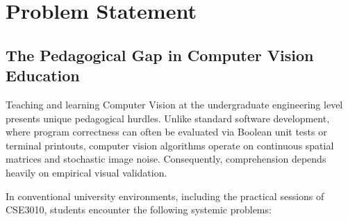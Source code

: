 \section{Problem Statement}

\subsection{The Pedagogical Gap in Computer Vision Education}
Teaching and learning Computer Vision at the undergraduate engineering level presents unique pedagogical hurdles. Unlike standard software development, where program correctness can often be evaluated via Boolean unit tests or terminal printouts, computer vision algorithms operate on continuous spatial matrices and stochastic image noise. Consequently, comprehension depends heavily on empirical visual validation.

In conventional university environments, including the practical sessions of CSE3010, students encounter the following systemic problems:

